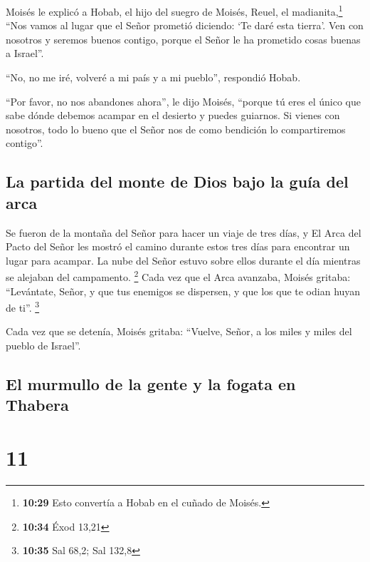  Moisés le explicó a Hobab, el hijo del suegro de Moisés,
Reuel, el madianita,\footnote{\textbf{10:29} Esto convertía a Hobab en
  el cuñado de Moisés.} ``Nos vamos al lugar que el Señor prometió
diciendo: `Te daré esta tierra'. Ven con nosotros y seremos buenos
contigo, porque el Señor le ha prometido cosas buenas a Israel''.

 ``No, no me iré, volveré a mi país y a mi pueblo'',
respondió Hobab.

 ``Por favor, no nos abandones ahora'', le dijo Moisés,
``porque tú eres el único que sabe dónde debemos acampar en el desierto
y puedes guiarnos.  Si vienes con nosotros, todo lo bueno
que el Señor nos de como bendición lo compartiremos contigo''.

\hypertarget{la-partida-del-monte-de-dios-bajo-la-guuxeda-del-arca}{%
\subsection{La partida del monte de Dios bajo la guía del
arca}\label{la-partida-del-monte-de-dios-bajo-la-guuxeda-del-arca}}

 Se fueron de la montaña del Señor para hacer un viaje de
tres días, y El Arca del Pacto del Señor les mostró el camino durante
estos tres días para encontrar un lugar para acampar.  La
nube del Señor estuvo sobre ellos durante el día mientras se alejaban
del campamento. \footnote{\textbf{10:34} Éxod 13,21} 
Cada vez que el Arca avanzaba, Moisés gritaba: ``Levántate, Señor, y que
tus enemigos se dispersen, y que los que te odian huyan de ti''.
\footnote{\textbf{10:35} Sal 68,2; Sal 132,8}

 Cada vez que se detenía, Moisés gritaba: ``Vuelve,
Señor, a los miles y miles del pueblo de Israel''.

\hypertarget{el-murmullo-de-la-gente-y-la-fogata-en-thabera}{%
\subsection{El murmullo de la gente y la fogata en
Thabera}\label{el-murmullo-de-la-gente-y-la-fogata-en-thabera}}

\hypertarget{section-10}{%
\section{11}\label{section-10}}

